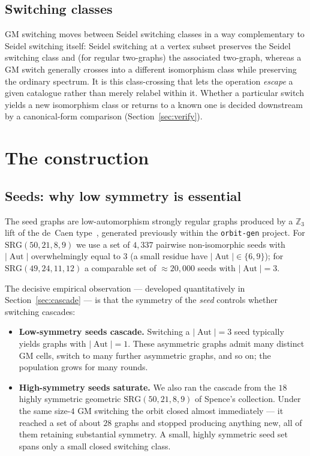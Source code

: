 \documentclass[11pt]{article}
\theoremstyle{definition}
\newcommand{\SRG}[1]{\mathrm{SRG}(#1)}
\newcommand{\Aut}{\operatorname{Aut}}
\begin{document}
\subsection{Switching classes}

GM switching moves between Seidel switching classes in a way complementary to Seidel
switching itself: Seidel switching at a vertex subset preserves the Seidel switching class
and (for regular two-graphs) the associated two-graph, whereas a GM switch generally
crosses into a different isomorphism class while preserving the ordinary spectrum. It is
this class-crossing that lets the operation \emph{escape} a given catalogue rather than
merely relabel within it. Whether a particular switch yields a new isomorphism class or
returns to a known one is decided downstream by a canonical-form comparison
(Section~\ref{sec:verify}).

\section{The construction}\label{sec:method}

\subsection{Seeds: why low symmetry is essential}\label{sec:seeds}

The seed graphs are low-automorphism strongly regular graphs produced by a
$\mathbb{Z}_3$ lift of the de~Caen type~\cite{decaen}, generated previously within the
\texttt{orbit-gen} project. For $\SRG{50,21,8,9}$ we use a set of $4{,}337$ pairwise
non-isomorphic seeds with $|\Aut|$ overwhelmingly equal to $3$ (a small residue have
$|\Aut|\in\{6,9\}$); for $\SRG{49,24,11,12}$ a comparable set of $\approx 20{,}000$ seeds
with $|\Aut|=3$.

The decisive empirical observation --- developed quantitatively in
Section~\ref{sec:cascade} --- is that the symmetry of the \emph{seed} controls whether
switching cascades:
\begin{itemize}
  \item \textbf{Low-symmetry seeds cascade.} Switching a $|\Aut|=3$ seed typically yields
  graphs with $|\Aut|=1$. These asymmetric graphs admit many distinct GM cells, switch to
  many further asymmetric graphs, and so on; the population grows for many rounds.
  \item \textbf{High-symmetry seeds saturate.} We also ran the cascade from the $18$
  highly symmetric geometric $\SRG{50,21,8,9}$ of Spence's collection. Under the same
  size-$4$ GM switching the orbit closed almost immediately --- it reached a set of about
  $28$ graphs and stopped producing anything new, all of them retaining substantial
  symmetry. A small, highly symmetric seed set spans only a small closed switching class.
\end{itemize}
\end{document}
